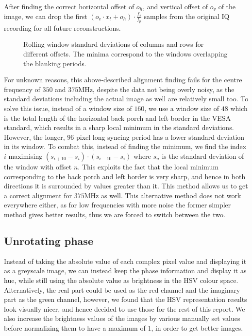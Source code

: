 \documentclass{article}
\begin{document}
After finding the correct horizontal offset of $o_h$, and vertical offset of $o_v$ of the image, we can drop the first $\left(o_v \cdot x_t + o_h\right) \cdot \frac{f_s}{f_p}$ samples from the original IQ recording for all future reconstructions.

\begin{figure}[htb]
\centering
\begin{subfigure}{.475\textwidth}
    \centering
    
\end{subfigure}
\hfill
\begin{subfigure}{.475\textwidth}
    \centering
    
\end{subfigure}

\caption{Rolling window standard deviations of columns and rows for different offsets. The minima correspond to the windows overlapping the blanking periods.}
\label{fig:stds}
\end{figure}

For unknown reasons, this above-described alignment finding fails for the centre frequency of $350$ and $375$MHz, despite the data not being overly noisy, as the standard deviations including the actual image as well are relatively small too. To solve this issue, instead of a window size of $160$, we use a window size of $48$ which is the total length of the horizontal back porch and left border in the VESA standard, which results in a sharp local minimum in the standard deviations. However, the longer, $96$ pixel long syncing period has a lower standard deviation in its window. To combat this, instead of finding the minimum, we find the index $i$ maximising $(s_{i+10}-s_i) \cdot (s_{i-10}-s_i)$ where $s_n$ is the standard deviation of the window with offset $n$. This exploits the fact that the local minimum corresponding to the back porch and left border is very sharp, and hence in both directions it is surrounded by values greater than it. This method allows us to get a correct alignment for $375$MHz as well. This alternative method does not work everywhere either, as for low frequencies with more noise the former simpler method gives better results, thus we are forced to switch between the two.

\subsection{Unrotating phase}

Instead of taking the absolute value of each complex pixel value and displaying it as a greyscale image, we can instead keep the phase information and display it as hue, while still using the absolute value as brightness in the HSV colour space. Alternatively, the real part could be used as the red channel and the imaginary part as the green channel, however, we found that the HSV representation results look visually nicer, and hence decided to use those for the rest of this report. We also increase the brightness values of the images by various manually set values before normalizing them to have a maximum of 1, in order to get better images.
\end{document}
